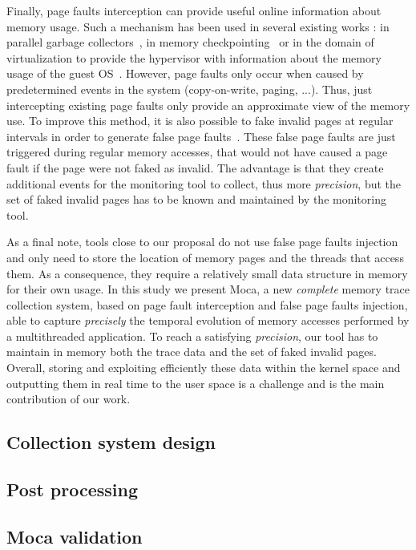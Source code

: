 Finally, page faults interception can provide useful online information about memory usage.
Such a mechanism has been used in several existing works : in parallel garbage collectors~\cite{Boehm91Mostly}, in memory checkpointing~\cite{Heo05Spaceefficient} or in the domain of virtualization to provide the hypervisor with information about the memory usage of the guest \gls{OS}~\cite{Jones06Geiger}.
However, page faults only occur when caused by predetermined events in the system (copy-on-write, paging, ...).
Thus, just intercepting existing page faults only provide an approximate view of the memory use.
To improve this method, it is also possible to fake invalid pages at regular intervals in order to generate false page faults~\cite{Bae12Dynamic,Diener13CommunicationBased}.
 These false page faults are just triggered during regular memory accesses, that would not have caused a page fault if the page were not faked as invalid.
The advantage is that they create additional events for the monitoring tool to collect, thus more \emph{precision}, but the set of faked invalid pages has to be known and maintained by the monitoring tool.

As a final note, tools close to our proposal do not use false page faults injection and only need to store the location of memory pages and the threads that access them.
As a consequence, they require a relatively small data structure in memory for their own usage.
In this study we present \gls{Moca}, a new \emph{complete} memory trace collection system, based on page fault interception and false page faults injection, able to capture \emph{precisely} the temporal evolution of memory accesses performed by a multithreaded application.
To reach a satisfying \emph{precision}, our tool has to maintain in memory both the trace data and the set of faked invalid pages.
Overall, storing and exploiting efficiently these data within the kernel space and outputting them in real time to the user space is a challenge and is the main contribution of our work.



\subsection{Collection system design}

\subsection{Post processing}

\subsection{Moca validation}

